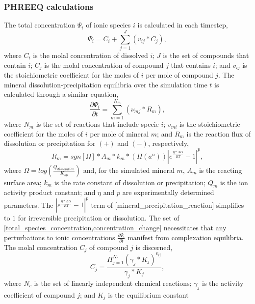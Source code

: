 \begin{supplementary}
\subsubsection{PHREEQ calculations}
The total concentration $\Psi_i$ of ionic species $i$ is calculated in each timestep, 
\begin{equation} \label{total_species_concentration}
    \Psi_i=C_i+\sum_{j=1}^{J}(v_{ij}*C_j),
\end{equation}
where $C_i$ is the molal concentration of dissolved $i$; $J$ is the set of compounds that contain $i$; $C_j$ is the molal concentration of compound $j$ that contains $i$; and $v_{ij}$ is the stoichiometric coefficient for the moles of $i$ per mole of compound $j$. The mineral dissolution-precipitation equilibria over the simulation time $t$ is calculated through a similar equation, 
\begin{equation} \label{concentration_change}
    \frac{\partial \Psi_i}{\partial t}=\sum_{m=1}^{N_m}(\nu_{mj}*R_m),
\end{equation}
where $N_m$ is the set of reactions that include specie $i$; $v_{mi}$ is the stoichiometric coefficient for the moles of $i$ per mole of mineral $m$; and $R_m$ is the reaction flux of dissolution or precipitation for $(+)$ and $(-)$, respectively,
\begin{equation} \label{mineral_precipitation_reaction}
    R_m=sgn[\Omega]*A_m*k_m*(\Pi(a^n)) |e^{\frac{\eta*\Delta G}{RT}}-1|^p,
\end{equation}
where $\Omega = log\left(⁡\frac{Q_{dissolution}}{K_{sp}}\right)$ and, for the simulated mineral $m$, $A_m$ is the reacting surface area; $k_m$ is the rate constant of dissolution or precipitation; $Q_m$ is the ion activity product constant; and $\eta$ and $p$ are experimentally determined parameters. The $|e^{\frac{\eta * \Delta G}{RT}}-1|^p$ term of \cref{mineral_precipitation_reaction} simplifies to $1$ for irreversible precipitation or dissolution. The set of \cref{total_species_concentration,concentration_change} necessitates that any perturbations to ionic concentrations $\frac{\partial \Psi_i}{\partial t}$ manifest from complexation equilibria. The molal concentration $C_j$ of compound $j$ is discerned,
\begin{equation}
    C_j=\frac{\Pi_{j=1}^{N_c} (\gamma_j*K_j )^{v_{ij}}}{\gamma_j*K_j},
\end{equation}
where $N_c$ is the set of linearly independent chemical reactions; $\gamma_j$ is the activity coefficient of compound $j$; and $K_j$ is the equilibrium constant

\end{supplementary}
